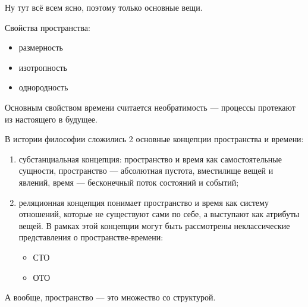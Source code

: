 
Ну тут всё всем ясно, поэтому только основные вещи.

Свойства пространства:
\begin{itemize}
    \item размерность
    \item изотропность
    \item однородность
\end{itemize}

Основным свойством времени считается необратимость --- процессы протекают из настоящего в будущее.

В истории философии сложились 2 основные концепции пространства и времени:
\begin{enumerate}
    \item субстанциальная концепция: пространство и время как самостоятельные сущности, пространство --- абсолютная пустота, вместилище вещей и явлений, время --- бесконечный поток состояний и событий;
    \item реляционная концепция понимает пространство и время как систему отношений, которые не существуют сами по себе, а выступают как атрибуты вещей. В рамках этой концепции могут быть рассмотрены неклассические представления о пространстве-времени:
    \begin{itemize}
        \item СТО
        \item ОТО
    \end{itemize}
\end{enumerate}

А вообще, пространство --- это множество со структурой.